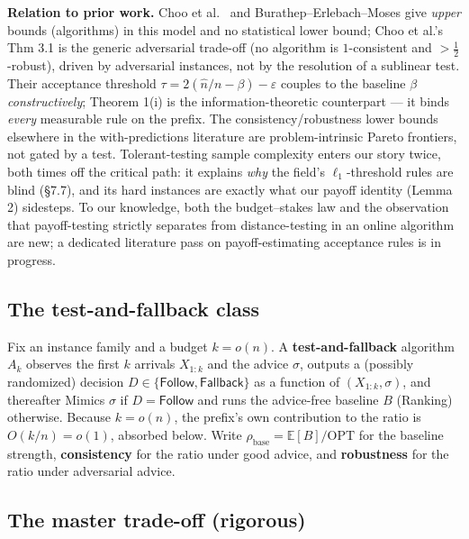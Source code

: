 \textbf{Relation to prior work.} Choo et al.~\cite{choo2024imperfect}
and Burathep--Erlebach--Moses \cite{bem2026testmatch} give \emph{upper}
bounds (algorithms) in this model and no statistical lower bound; Choo
et al.'s Thm 3.1 is the generic adversarial trade-off (no algorithm is
\(1\)-consistent and \(>\tfrac12\)-robust), driven by adversarial
instances, not by the resolution of a sublinear test. Their acceptance
threshold \(\tau = 2(\hat n/n-\beta)-\varepsilon\) couples to the
baseline \(\beta\) \emph{constructively}; Theorem 1(i) is the
information-theoretic counterpart --- it binds \emph{every} measurable
rule on the prefix. The consistency/robustness lower bounds elsewhere in
the with-predictions literature \cite{weizhang2020tradeoffs} are
problem-intrinsic Pareto frontiers, not gated by a test.
Tolerant-testing sample complexity \cite{canonne2022tolerance} enters
our story twice, both times off the critical path: it explains
\emph{why} the field's \(\ell_1\)-threshold rules are blind (§7.7), and
its hard instances are exactly what our payoff identity (Lemma 2)
sidesteps. To our knowledge, both the budget--stakes law and the
observation that payoff-testing strictly separates from distance-testing
in an online algorithm are new; a dedicated literature pass on
payoff-estimating acceptance rules is in progress.

\subsection{The test-and-fallback
class}

Fix an instance family and a budget \(k=o(n)\). A
\textbf{test-and-fallback} algorithm \(A_k\) observes the first \(k\)
arrivals \(X_{1:k}\) and the advice \(\sigma\), outputs a (possibly
randomized) decision \(D\in\{\mathsf{Follow},\mathsf{Fallback}\}\) as a
function of \((X_{1:k},\sigma)\), and thereafter Mimics \(\sigma\) if
\(D=\mathsf{Follow}\) and runs the advice-free baseline \(B\) (Ranking)
otherwise. Because \(k=o(n)\), the prefix's own contribution to the
ratio is \(O(k/n)=o(1)\), absorbed below. Write \(\rho_{\mathrm{base}} =
\mathbb E[B]/\mathrm{OPT}\) for the baseline strength,
\textbf{consistency} for the ratio under good advice, and
\textbf{robustness} for the ratio under adversarial advice.

\subsection{The master trade-off
(rigorous)}

